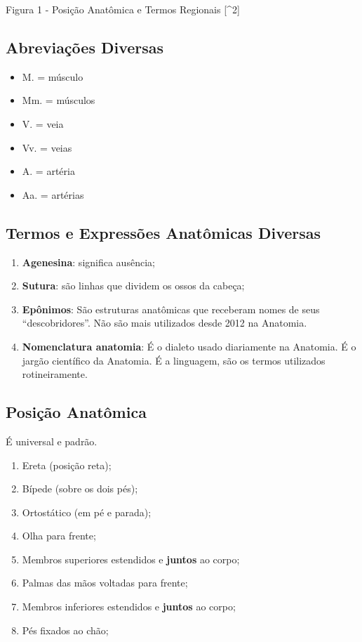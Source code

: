 \documentclass[
]{book}
\providecommand{\tightlist}{%
  \setlength{\itemsep}{0pt}\setlength{\parskip}{0pt}}
\begin{document}
Figura 1 - Posição Anatômica e Termos Regionais {[}\^{}2{]}

\hypertarget{abreviauxe7uxf5es-diversas}{%
\subsection{Abreviações Diversas}\label{abreviauxe7uxf5es-diversas}}

\begin{itemize}
\tightlist
\item
  M. = músculo
\item
  Mm. = músculos
\item
  V. = veia
\item
  Vv. = veias
\item
  A. = artéria
\item
  Aa. = artérias
\end{itemize}

\hypertarget{termos-e-expressuxf5es-anatuxf4micas-diversas}{%
\subsection{Termos e Expressões Anatômicas Diversas}\label{termos-e-expressuxf5es-anatuxf4micas-diversas}}

\begin{enumerate}
\def\labelenumi{\arabic{enumi}.}
\tightlist
\item
  \textbf{Agenesina}: significa ausência;
\item
  \textbf{Sutura}: são linhas que dividem os ossos da cabeça;
\item
  \textbf{Epônimos}: São estruturas anatômicas que receberam nomes de seus ``descobridores''. Não são mais utilizados desde 2012 na Anatomia.
\item
  \textbf{Nomenclatura anatomia}: É o dialeto usado diariamente na Anatomia. É o jargão científico da Anatomia. É a linguagem, são os termos utilizados rotineiramente.
\end{enumerate}

\hypertarget{posiuxe7uxe3o-anatuxf4mica}{%
\subsection{Posição Anatômica}\label{posiuxe7uxe3o-anatuxf4mica}}

É universal e padrão.

\begin{enumerate}
\def\labelenumi{\arabic{enumi}.}
\tightlist
\item
  Ereta (posição reta);
\item
  Bípede (sobre os dois pés);
\item
  Ortostático (em pé e parada);
\item
  Olha para frente;
\item
  Membros superiores estendidos e \textbf{juntos} ao corpo;
\item
  Palmas das mãos voltadas para frente;
\item
  Membros inferiores estendidos e \textbf{juntos} ao corpo;
\item
  Pés fixados ao chão;
\end{enumerate}
\end{document}
